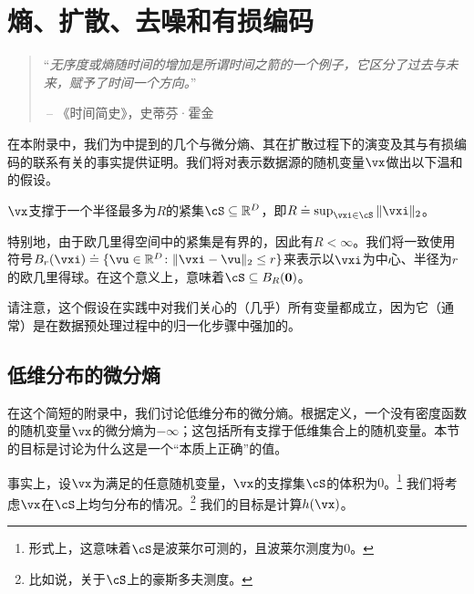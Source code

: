 \documentclass[../../book-main_zh.tex]{subfiles}
\begin{document}
\chapter{熵、扩散、去噪和有损编码}\label{app:entropy}\label{app:diffusion-denoising}

\begin{quote}
“{\em 无序度或熵随时间的增加是所谓时间之箭的一个例子，它区分了过去与未来，赋予了时间一个方向。}”

$~$\hfill -- 《时间简史》，史蒂芬·霍金
 \end{quote}
\vspace{5mm}

在本附录中，我们为中提到的几个与微分熵、其在扩散过程下的演变及其与有损编码的联系有关的事实提供证明。我们将对表示数据源的随机变量\(\vx\)做出以下温和的假设。

\begin{assumption}\label{assumption:entropy_x_compact_support}
    \(\vx\)支撑于一个半径最多为\(R\)的紧集\(\cS \subseteq \R^{D}\)，即\(R \doteq \sup_{\vxi \in \cS}\norm{\vxi}_{2}\)。
\end{assumption}

特别地，由于欧几里得空间中的紧集是有界的，因此有\(R < \infty\)。我们将一致使用符号\(B_{r}(\vxi) \doteq \{\vu \in \R^{D} \colon \norm{\vxi - \vu}_{2} \leq r\}\)来表示以\(\vxi\)为中心、半径为\(r\)的欧几里得球。在这个意义上，意味着\(\cS \subseteq B_{R}(\vzero)\)。

请注意，这个假设在实践中对我们关心的（几乎）所有变量都成立，因为它（通常）是在数据预处理过程中的归一化步骤中强加的。

\section{低维分布的微分熵}\label{sec:low_dim_entropy}

在这个简短的附录中，我们讨论低维分布的微分熵。根据定义，一个没有密度函数的随机变量\(\vx\)的微分熵为\(-\infty\)；这包括所有支撑于低维集合上的随机变量。本节的目标是讨论为什么这是一个“本质上正确”的值。

事实上，设\(\vx\)为满足的任意随机变量，\(\vx\)的支撑集\(\cS\)的体积为\(0\)。\footnote{形式上，这意味着\(\cS\)是波莱尔可测的，且波莱尔测度为\(0\)。} 我们将考虑\(\vx\)在\(\cS\)上均匀分布的情况。\footnote{比如说，关于\(\cS\)上的豪斯多夫测度。} 我们的目标是计算\(h(\vx)\)。
\end{document}
